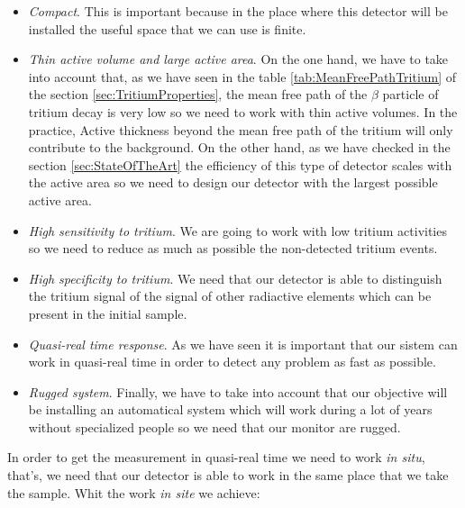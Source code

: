 \begin{itemize}

\item{} \textit{Compact}. This is important because in the place where this detector will be installed the useful space that we can use is finite.

\item{} \textit{Thin active volume and large active area}. On the one hand, we have to take into account that, as we have seen in the table \ref{tab:MeanFreePathTritium} of the section \ref{sec:TritiumProperties}, the mean free path of the $\beta$ particle of tritium decay is very low so we need to work with thin active volumes. In the practice, Active thickness beyond the mean free path of the tritium will only contribute to the background. On the other hand, as we have checked in the section \ref{sec:StateOfTheArt} the efficiency of this type of detector scales with the active area so we need to design our detector with the largest possible active area.

\item{} \textit{High sensitivity to tritium}. We are going to work with low tritium activities so we need to reduce as much as possible the non-detected tritium events.

\item{} \textit{High specificity to tritium}. We need that our detector is able to distinguish the tritium signal of the signal of other radiactive elements which can be present in the initial sample.

\item{} \textit{Quasi-real time response}. As we have seen it is important that our sistem can work in quasi-real time in order to detect any problem as fast as possible. 

\item{} \textit{Rugged system}. Finally, we have to take into account that our objective will be installing an automatical system which will work during a lot of years without specialized people so we need that our monitor are rugged. 

\end{itemize}

In order to get the measurement in quasi-real time we need to work \textit{in situ}, that's, we need that our detector is able to work in the same place that we take the sample. Whit the work \textit{in site} we achieve:

